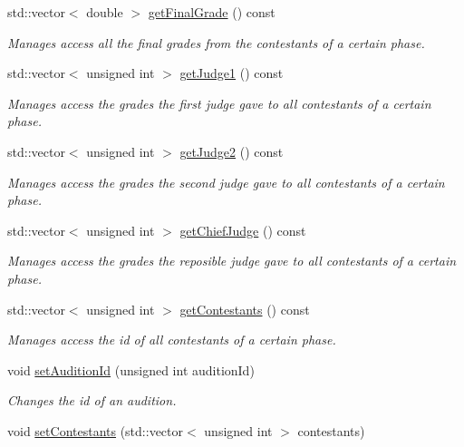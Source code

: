 \begin{DoxyCompactItemize}
std\+::vector$<$ double $>$ \hyperlink{class_phase_acc55a56cbaec90a2972cb78ad8ce085c}{get\+Final\+Grade} () const
\begin{DoxyCompactList}\small\item\em Manages access all the final grades from the contestants of a certain phase. \end{DoxyCompactList}\item 
std\+::vector$<$ unsigned int $>$ \hyperlink{class_phase_aa705f5aa86b20627a115034ed9881246}{get\+Judge1} () const
\begin{DoxyCompactList}\small\item\em Manages access the grades the first judge gave to all contestants of a certain phase. \end{DoxyCompactList}\item 
std\+::vector$<$ unsigned int $>$ \hyperlink{class_phase_ac8f4328b114a36e3296ee2f4e9fd06e8}{get\+Judge2} () const
\begin{DoxyCompactList}\small\item\em Manages access the grades the second judge gave to all contestants of a certain phase. \end{DoxyCompactList}\item 
std\+::vector$<$ unsigned int $>$ \hyperlink{class_phase_a1c251350327ab06f2cc8bb8f1331d370}{get\+Chief\+Judge} () const
\begin{DoxyCompactList}\small\item\em Manages access the grades the reposible judge gave to all contestants of a certain phase. \end{DoxyCompactList}\item 
std\+::vector$<$ unsigned int $>$ \hyperlink{class_phase_a670856408ac3d956d30e371dd69fbf13}{get\+Contestants} () const
\begin{DoxyCompactList}\small\item\em Manages access the id of all contestants of a certain phase. \end{DoxyCompactList}\item 
void \hyperlink{class_phase_af2bc70b0e24880d38e42f37ef31164ac}{set\+Audition\+Id} (unsigned int audition\+Id)
\begin{DoxyCompactList}\small\item\em Changes the id of an audition. \end{DoxyCompactList}\item 
void \hyperlink{class_phase_a3a08956302c65b5ccea41521059a787c}{set\+Contestants} (std\+::vector$<$ unsigned int $>$ contestants)

\end{DoxyCompactItemize}
